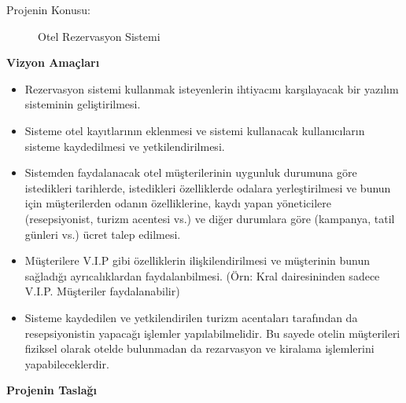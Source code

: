 \documentclass[12pt,a4paper]{report}
\begin{document}


\newpage

\begin{description}
\item[Projenin Konusu:] Otel Rezervasyon Sistemi \\[1cm]
\end{description}
{
\bf
Vizyon Amaçları
}

\begin{itemize}

\item {

Rezervasyon sistemi kullanmak isteyenlerin ihtiyacını karşılayacak bir yazılım sisteminin geliştirilmesi.

}

\item {

Sisteme otel kayıtlarının eklenmesi ve sistemi kullanacak kullanıcıların sisteme kaydedilmesi ve yetkilendirilmesi.

}

\item {

Sistemden faydalanacak otel müşterilerinin uygunluk durumuna göre istedikleri tarihlerde, istedikleri özelliklerde odalara yerleştirilmesi ve bunun için müşterilerden odanın özelliklerine, kaydı yapan yöneticilere (resepsiyonist, turizm acentesi vs.) ve diğer durumlara göre (kampanya, tatil günleri vs.) ücret talep edilmesi.

}

\item {

Müşterilere V.I.P gibi özelliklerin ilişkilendirilmesi ve müşterinin bunun sağladığı ayrıcalıklardan faydalanbilmesi. (Örn: Kral dairesininden sadece V.I.P. Müşteriler faydalanabilir)

}

\item {

Sisteme kaydedilen ve yetkilendirilen turizm acentaları tarafından da resepsiyonistin yapacağı işlemler yapılabilmelidir. Bu sayede otelin müşterileri fiziksel olarak otelde bulunmadan da rezarvasyon ve kiralama işlemlerini yapabileceklerdir. \\[2cm]

}

\end{itemize}

{
\bf
Projenin Taslağı \\[0.2cm]
}
\end{document}
